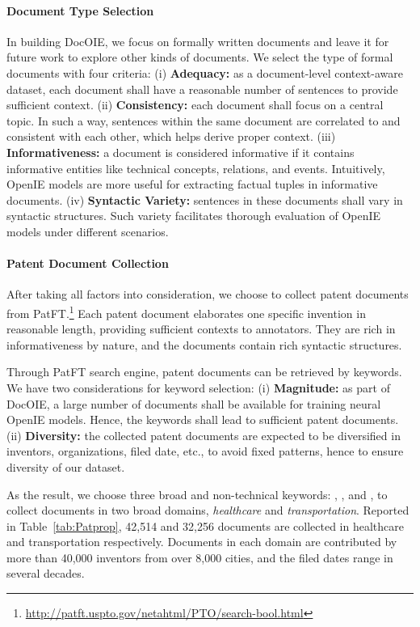 \documentclass[11pt,a4paper]{article}
\newcommand{\dname}{DocOIE\xspace}
\begin{document}
\paragraph{Document Type Selection} In building \dname, we focus on formally written documents and leave it for future work to explore other kinds of documents. We select the type of formal documents with four criteria: (i) \textbf{Adequacy:} as a document-level context-aware dataset, each document shall have a reasonable number of sentences to provide sufficient context. (ii) \textbf{Consistency:} each document shall focus on a central topic. In such a way, sentences within the same document are correlated to and consistent with each other, which helps derive proper context.  (iii) \textbf{Informativeness:} a document is considered informative if it contains informative entities like technical concepts, relations, and events. Intuitively, OpenIE models are more useful for extracting factual tuples in informative documents. (iv) \textbf{Syntactic Variety:}  sentences in these documents shall vary in syntactic structures. Such variety facilitates  thorough evaluation of OpenIE models under different scenarios.


\paragraph{Patent Document Collection} After taking all factors into consideration, we choose to collect patent documents from PatFT.\footnote{\url{http://patft.uspto.gov/netahtml/PTO/search-bool.html}} Each patent document elaborates one specific invention in reasonable length, providing sufficient contexts to annotators. They are rich in informativeness by nature, and the documents contain rich syntactic structures. 

Through PatFT search engine, patent documents can be retrieved by keywords. We have two considerations for keyword selection: 
(i) \textbf{Magnitude:} as part of \dname, a large number of documents shall be available for training  neural OpenIE models. Hence, the keywords shall lead to sufficient patent documents.
(ii) \textbf{Diversity:} the collected patent documents are expected to be diversified in  inventors, organizations, filed date, etc., to avoid fixed patterns, hence to ensure diversity of our dataset.

As the result, we choose three broad and non-technical keywords: , , and , to collect documents in two broad domains,  \textit{healthcare} and \textit{transportation}. Reported in Table~\ref{tab:Patprop},  42,514 and 32,256 documents are collected in healthcare and transportation respectively. Documents in each domain are contributed by more than 40,000 inventors from over 8,000 cities, and the filed dates range in several decades. 
\end{document}
